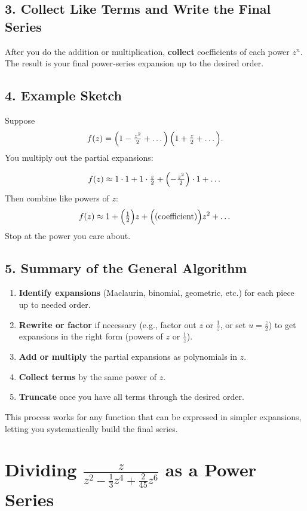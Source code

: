 \documentclass[12pt]{article}
\theoremstyle{definition} %
\theoremstyle{plain} %
\begin{document}
\subsection*{3. Collect Like Terms and Write the Final Series}

After you do the addition or multiplication, \textbf{collect} coefficients of each power $z^n$. The result is your final power‐series expansion up to the desired order. 

\subsection*{4. Example Sketch}

Suppose
\[
f(z) = \Bigl(1 - \tfrac{z^2}{2} + \dots\Bigr)\,\Bigl(1 + \tfrac{z}{2} + \dots\Bigr).
\]
You multiply out the partial expansions:

\[
f(z) 
\approx 1\cdot 1 
+ 1\cdot\tfrac{z}{2} 
+ \Bigl(-\tfrac{z^2}{2}\Bigr)\cdot 1
+ \dots
\]
Then combine like powers of $z$:
\[
f(z) 
\approx 1 
+ \Bigl(\tfrac{1}{2}\Bigr) z 
+ \Bigl(\text{(coefficient)}\Bigr) z^2
+ \dots
\]
Stop at the power you care about. 

\subsection*{5. Summary of the General Algorithm}

\begin{enumerate}
  \item \textbf{Identify expansions} (Maclaurin, binomial, geometric, etc.) for each piece up to needed order.
  \item \textbf{Rewrite or factor} if necessary (e.g., factor out $z$ or $\frac{1}{z}$, or set $u=\frac{z}{2}$) to get expansions in the right form (powers of $z$ or $\frac{1}{z}$).
  \item \textbf{Add or multiply} the partial expansions as polynomials in $z$. 
  \item \textbf{Collect terms} by the same power of $z$. 
  \item \textbf{Truncate} once you have all terms through the desired order.
\end{enumerate}

This process works for any function that can be expressed in simpler expansions, letting you systematically build the final series.

\section*{Dividing \(\displaystyle \frac{z}{z^2 - \tfrac{1}{3}z^4 + \tfrac{2}{45}z^6}\) as a Power Series}
\end{document}
